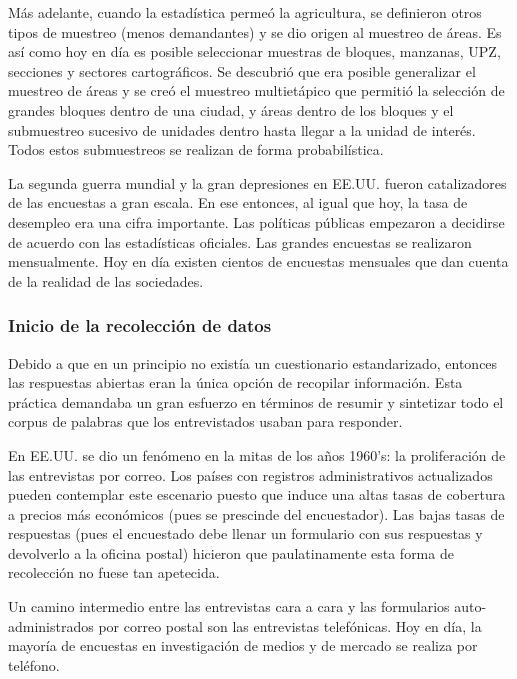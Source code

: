 \documentclass[
  10pt,
  spanish,
]{book}
\begin{document}
Más adelante, cuando la estadística permeó la agricultura, se definieron otros tipos de muestreo (menos demandantes) y se dio origen al muestreo de áreas. Es así como hoy en día es posible seleccionar muestras de bloques, manzanas, UPZ, secciones y sectores cartográficos. Se descubrió que era posible generalizar el muestreo de áreas y se creó el muestreo multietápico que permitió la selección de grandes bloques dentro de una ciudad, y áreas dentro de los bloques y el submuestreo sucesivo de unidades dentro hasta llegar a la unidad de interés. Todos estos submuestreos se realizan de forma probabilística.

La segunda guerra mundial y la gran depresiones en EE.UU. fueron catalizadores de las encuestas a gran escala. En ese entonces, al igual que hoy, la tasa de desempleo era una cifra importante. Las políticas públicas empezaron a decidirse de acuerdo con las estadísticas oficiales. Las grandes encuestas se realizaron mensualmente. Hoy en día existen cientos de encuestas mensuales que dan cuenta de la realidad de las sociedades.

\hypertarget{inicio-de-la-recolecciuxf3n-de-datos}{%
\subsubsection*{Inicio de la recolección de datos}\label{inicio-de-la-recolecciuxf3n-de-datos}}

Debido a que en un principio no existía un cuestionario estandarizado, entonces las respuestas abiertas eran la única opción de recopilar información. Esta práctica demandaba un gran esfuerzo en términos de resumir y sintetizar todo el corpus de palabras que los entrevistados usaban para responder.

En EE.UU. se dio un fenómeno en la mitas de los años 1960's: la proliferación de las entrevistas por correo. Los países con registros administrativos actualizados pueden contemplar este escenario puesto que induce una altas tasas de cobertura a precios más económicos (pues se prescinde del encuestador). Las bajas tasas de respuestas (pues el encuestado debe llenar un formulario con sus respuestas y devolverlo a la oficina postal) hicieron que paulatinamente esta forma de recolección no fuese tan apetecida.

Un camino intermedio entre las entrevistas cara a cara y las formularios auto-administrados por correo postal son las entrevistas telefónicas. Hoy en día, la mayoría de encuestas en investigación de medios y de mercado se realiza por teléfono.
\end{document}
